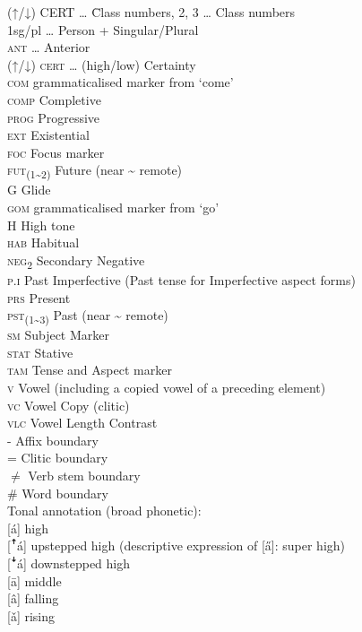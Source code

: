 \documentclass[output=paper]{langscibook}
\begin{document}
\begin{tabbing}
(↑/↓) CERT \ldots\hspace{1ex} \= Class numbers, 2, 3 \ldots \> Class numbers\\
1sg/pl \ldots \> Person + Singular/Plural\\
\textsc{ant} \ldots \> Anterior\\
(↑/↓) \textsc{cert} \ldots \> (high/low) Certainty\\
\textsc{com} \> grammaticalised marker from ‘come’\\
\textsc{comp} \> Completive\\
\textsc{prog} \> Progressive\\ 
\textsc{ext} \> Existential\\
\textsc{foc} \> Focus marker\\
\textsc{fut}\textsubscript{(1{\textasciitilde}2)} \> Future (near {\textasciitilde} remote)\\
G \> Glide\\
\textsc{gom} \> grammaticalised marker from ‘go’\\
H \> High tone\\
\textsc{hab} \> Habitual\\
\textsc{neg}\textsubscript{2} \> Secondary Negative\\
\textsc{p.i} \> Past Imperfective (Past tense for Imperfective aspect forms)\\
\textsc{prs} \> Present\\
\textsc{pst}\textsubscript{(1{\textasciitilde}3)} \> Past (near {\textasciitilde} remote)\\
\textsc{sm} \> Subject Marker\\
\textsc{stat} \> Stative\\
\textsc{tam} \> Tense and Aspect marker\\
\textsc{v} \> Vowel (including a copied vowel of a preceding element)\\
\textsc{vc} \> Vowel Copy (clitic)\\
\textsc{vlc} \> Vowel Length Contrast\\
- \> Affix boundary\\
= \> Clitic boundary\\
${\neq}$ \> Verb stem boundary\\
\# \> Word boundary\\
Tonal annotation (broad phonetic): \> \\
{[á]} \> high\\
{[ꜛá]} \> upstepped high (descriptive expression of [\H{a}]: super high)\\
{[ꜜá]} \> downstepped high\\
{[ā]} \> middle\\
{[â]} \> falling\\
{[ǎ]} \> rising\\
\end{tabbing}

\sloppy\printbibliography[heading=subbibliography,notkeyword=this]
\end{document}
